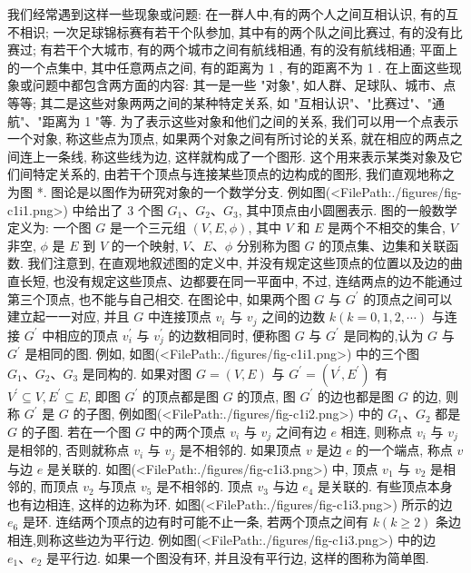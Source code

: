 
我们经常遇到这样一些现象或问题:
在一群人中,有的两个人之间互相认识, 有的互不相识;
一次足球锦标赛有若干个队参加, 其中有的两个队之间比赛过, 有的没有比赛过;
有若干个大城市, 有的两个城市之间有航线相通, 有的没有航线相通;
平面上的一个点集中, 其中任意两点之间, 有的距离为 1 , 有的距离不为 1 .
在上面这些现象或问题中都包含两方面的内容: 其一是一些 "对象", 如人群、足球队、城市、点等等; 其二是这些对象两两之间的某种特定关系, 如 "互相认识"、"比赛过"、"通航"、"距离为 1 "等.
为了表示这些对象和他们之间的关系, 我们可以用一个点表示一个对象, 称这些点为顶点, 如果两个对象之间有所讨论的关系, 就在相应的两点之间连上一条线, 称这些线为边, 这样就构成了一个图形.
这个用来表示某类对象及它们间特定关系的, 由若干个顶点与连接某些顶点的边构成的图形, 我们直观地称之为图 *.
图论是以图作为研究对象的一个数学分支.
例如图(<FilePath:./figures/fig-c1i1.png>) 中给出了 3 个图 $G_1 、 G_2 、 G_3$, 其中顶点由小圆圈表示.
图的一般数学定义为: 一个图 $G$ 是一个三元组 $(V, E, \phi)$, 其中 $V$ 和 $E$ 是两个不相交的集合, $V$ 非空, $\phi$ 是 $E$ 到 $V$ 的一个映射, $V 、 E 、 \phi$ 分别称为图 $G$ 的顶点集、边集和关联函数.
我们注意到, 在直观地叙述图的定义中, 并没有规定这些顶点的位置以及边的曲直长短, 也没有规定这些顶点、边都要在同一平面中, 不过, 连结两点的边不能通过第三个顶点, 也不能与自己相交.
在图论中, 如果两个图 $G$ 与 $G^{\prime}$ 的顶点之间可以建立起一一对应, 并且 $G$ 中连接顶点 $v_i$ 与 $v_j$ 之间的边数 $k(k=0,1,2, \cdots)$ 与连接 $G^{\prime}$ 中相应的顶点 $v_i^{\prime}$ 与 $v_j^{\prime}$ 的边数相同时, 便称图 $G$ 与 $G^{\prime}$ 是同构的,认为 $G$ 与 $G^{\prime}$ 是相同的图.
例如, 如图(<FilePath:./figures/fig-c1i1.png>) 中的三个图 $G_1 、 G_2 、 G_3$ 是同构的.
如果对图 $G=(V, E)$ 与 $G^{\prime}=\left(V^{\prime}, E^{\prime}\right)$ 有 $V^{\prime} \subseteq V, E^{\prime} \subseteq E$, 即图 $G^{\prime}$ 的顶点都是图 $G$ 的顶点, 图 $G^{\prime}$ 的边也都是图 $G$ 的边, 则称 $G^{\prime}$ 是 $G$ 的子图, 例如图(<FilePath:./figures/fig-c1i2.png>) 中的 $G_1 、 G_2$ 都是 $G$ 的子图.
若在一个图 $G$ 中的两个顶点 $v_i$ 与 $v_j$ 之间有边 $e$ 相连, 则称点 $v_i$ 与 $v_j$ 是相邻的, 否则就称点 $v_i$ 与 $v_j$ 是不相邻的.
如果顶点 $v$ 是边 $e$ 的一个端点, 称点 $v$ 与边 $e$ 是关联的.
如图(<FilePath:./figures/fig-c1i3.png>) 中, 顶点 $v_1$ 与 $v_2$ 是相邻的, 而顶点 $v_2$ 与顶点 $v_5$ 是不相邻的.
顶点 $v_3$ 与边 $e_4$ 是关联的.
有些顶点本身也有边相连, 这样的边称为环.
如图(<FilePath:./figures/fig-c1i3.png>) 所示的边 $e_6$ 是环.
连结两个顶点的边有时可能不止一条, 若两个顶点之间有 $k(k \geqslant 2)$ 条边相连,则称这些边为平行边.
例如图(<FilePath:./figures/fig-c1i3.png>) 中的边 $e_1 、 e_2$ 是平行边.
如果一个图没有环, 并且没有平行边, 这样的图称为简单图.
